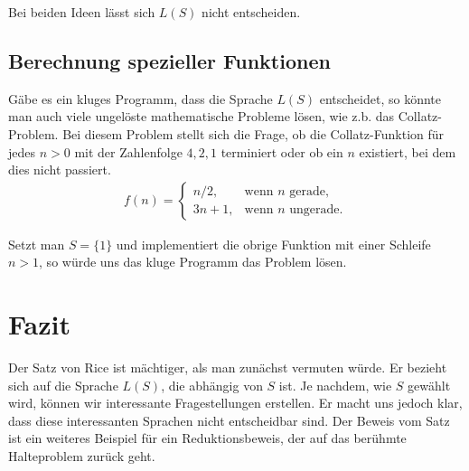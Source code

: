 \documentclass[journal]{IEEEtran}
\begin{document}
Bei beiden Ideen lässt sich $L(S)$ nicht entscheiden.

\subsection{Berechnung spezieller Funktionen}

Gäbe es ein kluges Programm, dass die Sprache $L(S)$ entscheidet, so könnte man auch viele ungelöste mathematische Probleme lösen, wie z.b. das Collatz-Problem. Bei diesem Problem stellt sich die Frage, ob die Collatz-Funktion für jedes $n > 0$ mit der Zahlenfolge $4, 2, 1$ terminiert oder ob ein $n$ existiert, bei dem dies nicht passiert.
\begin{align*}
  f(n)=\begin{cases}
  n/2,  & \text{wenn }n\text{ gerade,}\\
  3n+1, & \text{wenn }n\text{ ungerade.}
\end{cases}
\end{align*}

Setzt man $S = \{ 1 \}$ und implementiert die obrige Funktion mit einer Schleife $n > 1$, so würde uns das kluge Programm das Problem lösen.

%



\section{Fazit}

Der Satz von Rice ist mächtiger, als man zunächst vermuten würde. Er bezieht sich auf die Sprache $L(S)$, die abhängig von $S$ ist. Je nachdem, wie $S$ gewählt wird, können wir interessante Fragestellungen erstellen. Er macht uns jedoch klar, dass diese interessanten Sprachen nicht entscheidbar sind. Der Beweis vom Satz ist ein weiteres Beispiel für ein Reduktionsbeweis, der auf das berühmte Halteproblem zurück geht.




\end{document}
